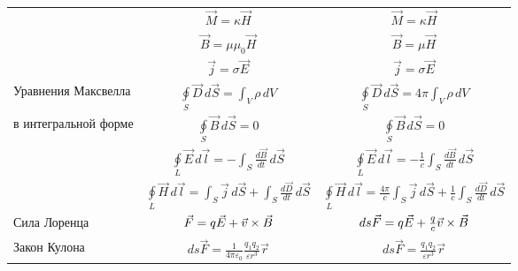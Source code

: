 \begin{longtable}{|L{4cm}|c|c|}
												 &                          $\vec{M}=\kappa\vec{H}$                          &                                    $\vec{M}=\kappa\vec{H}$                                     \\
												 &                         $\vec{B}=\mu\mu_0\vec{H}$                         &                                      $\vec{B}=\mu\vec{H}$                                      \\
	                                             &                          $\vec{j}=\sigma\vec{E}$                          &                                    $\vec{j}=\sigma\vec{E}$                                     \\ \hline
	Уравнения Максвелла                          &             $\oint\limits_{S}\vec{D}\,d\vec{S}=\int_{V}\rho\,dV$              &                      $\oint\limits_{S}\vec{D}\,d\vec{S}=4\pi\int_{V}\rho\,dV$                      \\
	в интегральной форме                         &                     $\oint\limits_{S}\vec{B}\,d\vec{S}=0$                     &                               $\oint\limits_{S}\vec{B}\,d\vec{S}=0$                                \\
	                                             & $\oint\limits_{L}\vec{E}\,d\vec{l}=-\int_{S}\frac{d\vec{B}}{d t}\,d\vec{S}$ &      $\oint\limits_{L}\vec{E}\,d\vec{l}=-\frac{1}{c}\int_{S}\frac{d\vec{B}}{d t}\,d\vec{S}$      \\
	                                             &   $\oint\limits_{L}\vec{H}\,d\vec{l}=\int_{S}\vec{j}\,d\vec{S}+\int_{S}\frac{d\vec{D}}{d t}\,d\vec{S}$   & $\oint\limits_{L}\vec{H}\,d\vec{l}=\frac{4\pi}{c}\int_{S}\vec{j}\,d\vec{S}+\frac{1}{c}\int_{S}\frac{d\vec{D}}{d t}\,d\vec{S}$ \\ \hline
	Сила Лоренца                                 &                  $\vec{F}=q\vec{E}+\vec{v} \times \vec{B}$                   &            $ds\vec{F}=q\vec{E}+\frac{q\mathstrut}{c\mathstrut}\vec{v} \times \vec{B}$            \\ \hline
	Закон Кулона                                 &   $ds \vec{F}=\frac{1}{4\pi\varepsilon_0}\frac{q_1q_2}{\varepsilon r^3}\vec{r}$    &                          $ds\vec{F}=\frac{q_1q_2}{\varepsilon r^3}\vec{r}$                           \\[2ex] \hline

\end{longtable}
